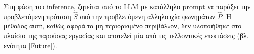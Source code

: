 Στη φάση του inference, ζητείται από το LLM με κατάλληλο prompt να παράξει την προβλεπόμενη πρόταση $\hat S$ από την προβλεπόμενη αλληλουχία φωνημάτων $\hat P$. Η μέθοδος αυτή, καθώς αφορά το μη περιορισμένο περιβάλλον, δεν υλοποιήθηκε στο πλαίσιο της παρούσας εργασίας και αποτελεί μία από τις μελλοντικές επεκτάσεις (βλ. ενότητα \ref{Future}).
